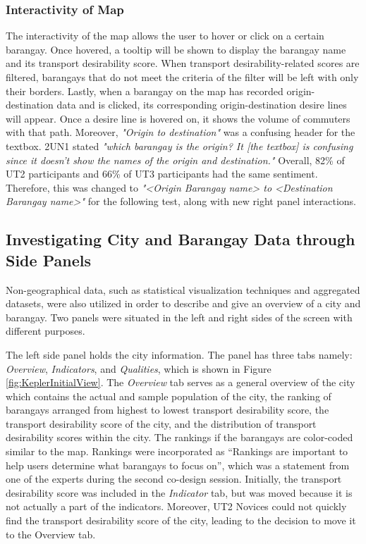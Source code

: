 \documentclass{sigchi}
\begin{document}
\subsubsection{Interactivity of Map}
The interactivity of the map allows the user to hover or click on a certain barangay. Once hovered, a tooltip will be shown to display the barangay name and its transport desirability score. When transport desirability-related scores are filtered, barangays that do not meet the criteria of the filter will be left with only their borders.  Lastly, when a barangay on the map has recorded origin-destination data and is clicked, its corresponding origin-destination desire lines will appear. Once a desire line is hovered on, it shows the volume of commuters with that path. Moreover, \textit{"Origin to destination"} was a confusing header for the textbox. 2UN1 stated \textit{"which barangay is the origin? It [the textbox] is confusing since it doesn't show the names of the origin and destination."} Overall, 82\% of UT2 participants and 66\% of UT3 participants had the same sentiment. Therefore, this was changed to \textit{"<Origin Barangay name> to <Destination Barangay name>"} for the following test, along with new right panel interactions. 


\subsection{Investigating City and Barangay Data through Side Panels}
Non-geographical data, such as statistical visualization techniques and aggregated datasets, were also utilized in order to describe and give an overview of a city and barangay. Two panels were situated in the left and right sides of the screen with different purposes.

The left side panel holds the city information. The panel has three tabs namely: \textit{Overview}, \textit{Indicators}, and \textit{Qualities}, which is shown in Figure \ref{fig:KeplerInitialView}. The \textit{Overview} tab serves as a general overview of the city which contains the actual and sample population of the city, the ranking of barangays arranged from highest to lowest transport desirability score, the transport desirability score of the city, and the distribution of transport desirability scores within the city. The rankings if the barangays are color-coded similar to the map. Rankings were incorporated as “Rankings are important to help users determine what barangays to focus on”, which was a statement from one of the experts during the second co-design session. Initially, the transport desirability score was included in the \textit{Indicator} tab, but was moved because it is not actually a part of the indicators. Moreover, UT2 Novices could not quickly find the transport desirability score of the city, leading to the decision to move it to the Overview tab. 
\end{document}
